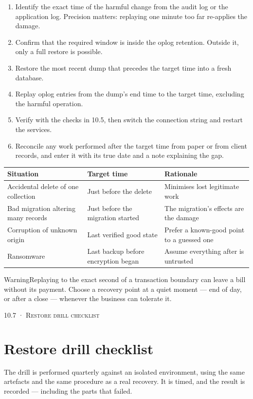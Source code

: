 \documentclass[11pt,a4paper,oneside]{book}
\begin{document}
\begin{enumerate}
\item Identify the exact time of the harmful change from the audit log or the application log. Precision matters: replaying one minute too far re-applies the damage.
\item Confirm that the required window is inside the oplog retention. Outside it, only a full restore is possible.
\item Restore the most recent dump that precedes the target time into a fresh database.
\item Replay oplog entries from the dump's end time to the target time, excluding the harmful operation.
\item Verify with the checks in 10.5, then switch the connection string and restart the services.
\item Reconcile any work performed after the target time from paper or from client records, and enter it with its true date and a note explaining the gap.
\end{enumerate}
\begin{center}\small
\begin{tabularx}{\linewidth}{|X|X|X|}
\hline
\rowcolor{lightgrey}
\textbf{Situation} & \textbf{Target time} & \textbf{Rationale} \\ \hline
Accidental delete of one collection & Just before the delete & Minimises lost legitimate work \\ \hline
Bad migration altering many records & Just before the migration started & The migration's effects are the damage \\ \hline
Corruption of unknown origin & Last verified good state & Prefer a known-good point to a guessed one \\ \hline
Ransomware & Last backup before encryption began & Assume everything after is untrusted \\ \hline
\end{tabularx}
\end{center}
\begin{notebox}WarningReplaying to the exact second of a transaction boundary can leave a bill without its payment. Choose a recovery point at a quiet moment — end of day, or after a close — whenever the business can tolerate it.\end{notebox}
\textsc{\small\color{crimson}10.7 · Restore drill checklist}\par\medskip
\section*{Restore drill checklist}
The drill is performed quarterly against an isolated environment, using the same artefacts and the same procedure as a real recovery. It is timed, and the result is recorded — including the parts that failed.
\end{document}
